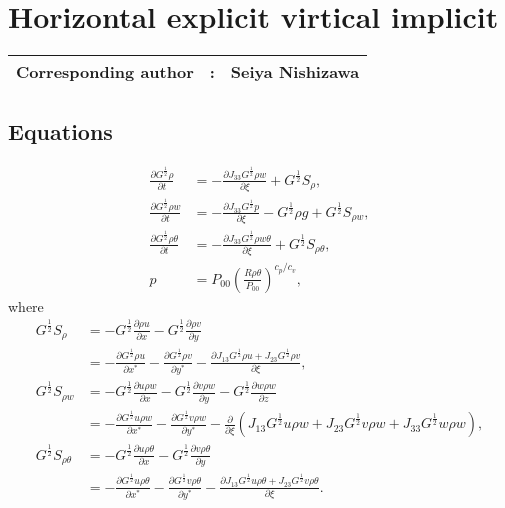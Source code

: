 \chapter{Horizontal explicit virtical implicit}
\label{chap:hevi}
{\bf \Large 
\begin{tabular}{ccc}
\hline
  Corresponding author & : & Seiya Nishizawa\\
\hline
\end{tabular}
}

\section{Equations}

\begin{align}
  \frac{\partial G^{\frac{1}{2}}\rho}{\partial t}
  &= -\frac{\partial J_{33}G^{\frac{1}{2}}\rho w}{\partial \xi} + G^{\frac{1}{2}}S_\rho, \\
  \frac{\partial G^{\frac{1}{2}}\rho w}{\partial t}
  &= -\frac{\partial J_{33}G^{\frac{1}{2}}p}{\partial \xi} -G^{\frac{1}{2}}\rho g + G^{\frac{1}{2}}S_{\rho w}, \\
  \frac{\partial G^{\frac{1}{2}}\rho\theta}{\partial t}
  &= -\frac{\partial J_{33}G^{\frac{1}{2}}\rho w\theta}{\partial \xi} + G^{\frac{1}{2}}S_{\rho\theta}, \\
  p &= P_{00}\left(\frac{R\rho\theta}{P_{00}}\right)^{c_p/c_v},
\end{align}
where
\begin{align}
  G^{\frac{1}{2}}S_\rho
  &= - G^{\frac{1}{2}}\frac{\partial \rho u}{\partial x}
     - G^{\frac{1}{2}}\frac{\partial \rho v}{\partial y} \nonumber\\
  &= - \frac{\partial G^{\frac{1}{2}}\rho u}{\partial x^*}
     - \frac{\partial G^{\frac{1}{2}}\rho v}{\partial y^*}
     - \frac{\partial J_{13}G^{\frac{1}{2}}\rho u + J_{23}G^{\frac{1}{2}}\rho v}{\partial \xi}, \\
  G^{\frac{1}{2}}S_{\rho w}
  &= - G^{\frac{1}{2}}\frac{\partial u\rho w}{\partial x}
     - G^{\frac{1}{2}}\frac{\partial v\rho w}{\partial y}
     - G^{\frac{1}{2}}\frac{\partial w\rho w}{\partial z} \nonumber\\
  &= - \frac{\partial G^{\frac{1}{2}}u\rho w}{\partial x^*}
     - \frac{\partial G^{\frac{1}{2}}v\rho w}{\partial y^*}
     - \frac{\partial}{\partial \xi}(J_{13}G^{\frac{1}{2}}u\rho w + J_{23}G^{\frac{1}{2}}v\rho w + J_{33}G^{\frac{1}{2}}w\rho w), \\
  G^{\frac{1}{2}}S_{\rho\theta}
  &= - G^{\frac{1}{2}}\frac{\partial u\rho\theta}{\partial x}
     - G^{\frac{1}{2}}\frac{\partial v\rho\theta}{\partial y} \nonumber\\
  &= - \frac{\partial G^{\frac{1}{2}}u\rho\theta}{\partial x^*}
     - \frac{\partial G^{\frac{1}{2}}v\rho\theta}{\partial y^*}
     - \frac{\partial J_{13}G^{\frac{1}{2}}u\rho\theta+J_{23}G^{\frac{1}{2}}v\rho\theta}{\partial \xi}.
\end{align}

